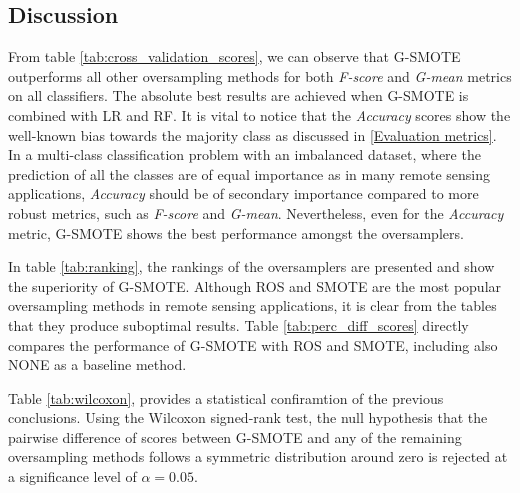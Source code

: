 \documentclass[remotesensing,article,submit,moreauthors,pdftex]{Definitions/mdpi}
\begin{document}

\subsection{Discussion}

From table \ref{tab:cross_validation_scores}, we can observe that G-SMOTE outperforms all other oversampling methods for both \textit{F-score} and \textit{G-mean} metrics on all classifiers. The absolute best results are achieved when G-SMOTE is combined with LR and RF. It is vital to notice that the \textit{Accuracy} scores show the well-known bias towards the majority class as discussed in \ref{Evaluation metrics}. In a multi-class classification problem with an imbalanced dataset, where the prediction of all the classes are of equal importance as in many remote sensing applications, \textit{Accuracy} should be of secondary importance compared to more robust metrics, such as \textit{F-score} and \textit{G-mean}. Nevertheless, even for the \textit{Accuracy} metric, G-SMOTE shows the best performance amongst the oversamplers.

In table \ref{tab:ranking}, the rankings of the oversamplers are presented
and show the superiority of G-SMOTE. Although ROS and SMOTE are the most popular
oversampling methods in remote sensing applications, it is clear from the tables
that they produce suboptimal results. Table \ref{tab:perc_diff_scores} directly compares the performance of G-SMOTE with ROS and SMOTE, including also NONE as a baseline method.

Table \ref{tab:wilcoxon}, provides a statistical confiramtion of the previous conclusions. Using the Wilcoxon signed-rank test, the null hypothesis that the pairwise difference of scores between G-SMOTE and any of the remaining oversampling methods follows a symmetric distribution around zero is rejected at a significance level of $\alpha = 0.05$. 
\end{document}
